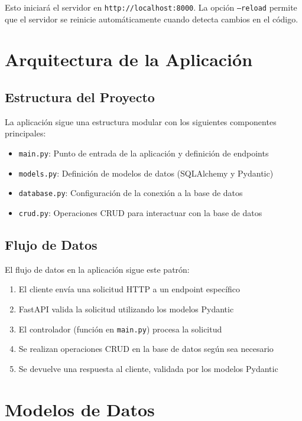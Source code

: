 \documentclass[12pt,letterpaper]{report}
\begin{document}
Esto iniciará el servidor en \texttt{http://localhost:8000}. La opción \texttt{--reload} permite que el servidor se reinicie automáticamente cuando detecta cambios en el código.

\chapter{Arquitectura de la Aplicación}

\section{Estructura del Proyecto}
La aplicación sigue una estructura modular con los siguientes componentes principales:

\begin{itemize}
    \item \texttt{main.py}: Punto de entrada de la aplicación y definición de endpoints
    \item \texttt{models.py}: Definición de modelos de datos (SQLAlchemy y Pydantic)
    \item \texttt{database.py}: Configuración de la conexión a la base de datos
    \item \texttt{crud.py}: Operaciones CRUD para interactuar con la base de datos
\end{itemize}

\section{Flujo de Datos}
El flujo de datos en la aplicación sigue este patrón:

\begin{enumerate}
    \item El cliente envía una solicitud HTTP a un endpoint específico
    \item FastAPI valida la solicitud utilizando los modelos Pydantic
    \item El controlador (función en \texttt{main.py}) procesa la solicitud
    \item Se realizan operaciones CRUD en la base de datos según sea necesario
    \item Se devuelve una respuesta al cliente, validada por los modelos Pydantic
\end{enumerate}

\chapter{Modelos de Datos}
\end{document}
